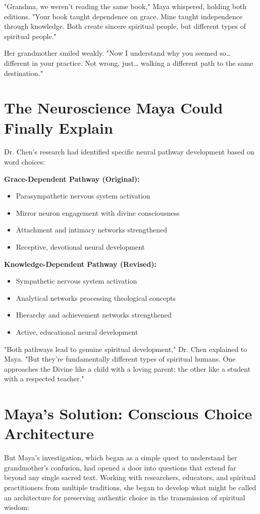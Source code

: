 \documentclass[11pt,twoside]{book}
\begin{document}
"Grandma, we weren't reading the same book," Maya whispered, holding both editions. "Your book taught dependence on grace. Mine taught independence through knowledge. Both create sincere spiritual people, but different types of spiritual people."

Her grandmother smiled weakly. "Now I understand why you seemed so\ldots{} different in your practice. Not wrong, just\ldots{} walking a different path to the same destination."
\section*{The Neuroscience Maya Could Finally Explain}
\label{sec:org245e182}

Dr. Chen's research had identified specific neural pathway development based on word choices:

\textbf{\textbf{Grace-Dependent Pathway (Original):}}
\begin{itemize}
\item Parasympathetic nervous system activation
\item Mirror neuron engagement with divine consciousness
\item Attachment and intimacy networks strengthened
\item Receptive, devotional neural development
\end{itemize}

\textbf{\textbf{Knowledge-Dependent Pathway (Revised):}}
\begin{itemize}
\item Sympathetic nervous system activation
\item Analytical networks processing theological concepts
\item Hierarchy and achievement networks strengthened
\item Active, educational neural development
\end{itemize}

"Both pathways lead to genuine spiritual development," Dr. Chen explained to Maya. "But they're fundamentally different types of spiritual humans. One approaches the Divine like a child with a loving parent; the other like a student with a respected teacher."
\section*{Maya's Solution: Conscious Choice Architecture}
\label{sec:org268890f}

But Maya's investigation, which began as a simple quest to understand her grandmother's confusion, had opened a door into questions that extend far beyond any single sacred text. Working with researchers, educators, and spiritual practitioners from multiple traditions, she began to develop what might be called an architecture for preserving authentic choice in the transmission of spiritual wisdom:
\end{document}
